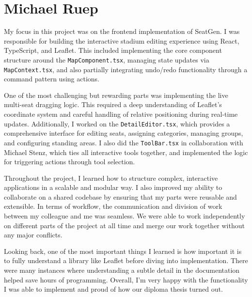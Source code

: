 \section{Michael Ruep}

My focus in this project was on the frontend implementation of SeatGen. I was responsible for building the interactive stadium editing experience using React, TypeScript, and Leaflet. This included implementing the core component structure around the \texttt{MapComponent.tsx}, managing state updates via \texttt{MapContext.tsx}, and also partially integrating undo/redo functionality through a command pattern using actions.

One of the most challenging but rewarding parts was implementing the live multi-seat dragging logic. This required a deep understanding of Leaflet’s coordinate system and careful handling of relative positioning during real-time updates. Additionally, I worked on the \texttt{DetailEditor.tsx}, which provides a comprehensive interface for editing seats, assigning categories, managing groups, and configuring standing areas. I also did the \texttt{ToolBar.tsx} in collaboration with Michael Stenz, which ties all interactive tools together, and implemented the logic for triggering actions through tool selection.

Throughout the project, I learned how to structure complex, interactive applications in a scalable and modular way. I also improved my ability to collaborate on a shared codebase by ensuring that my parts were reusable and extensible. In terms of workflow, the communication and division of work between my colleague and me was seamless. We were able to work independently on different parts of the project at all time and merge our work together without any major conflicts.

Looking back, one of the most important things I learned is how important it is to fully understand a library like Leaflet before diving into implementation. There were many instances where understanding a subtle detail in the documentation helped save hours of programming. Overall, I’m very happy with the functionality I was able to implement and proud of how our diploma thesis turned out.


